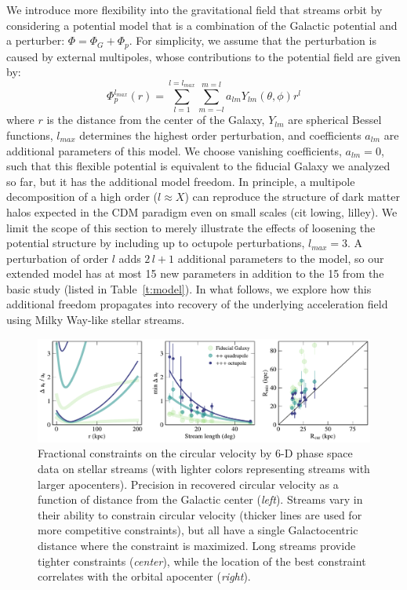 \documentclass[modern]{aastex61}
\begin{document}
We introduce more flexibility into the gravitational field that streams orbit by considering a potential model that is a combination of the Galactic potential and a perturber: $\Phi = \Phi_{G} + \Phi_{p}$. 
For simplicity, we assume that the perturbation is caused by external multipoles, whose contributions to the potential field are given by:
\begin{equation}
\Phi_{p}^{l_{max}}(r) = \sum_{l=1}^{l=l_{max}}\sum_{m=-l}^{m=l} a_{lm} Y_{lm}(\theta,\phi) r^l
\label{eq:multipoles}
\end{equation}
where $r$ is the distance from the center of the Galaxy, $Y_{lm}$ are spherical Bessel functions, $l_{max}$ determines the highest order perturbation, and coefficients $a_{lm}$ are additional parameters of this model.
We choose vanishing coefficients, $a_{lm}=0$, such that this flexible potential is equivalent to the fiducial Galaxy we analyzed so far, but it has the additional model freedom.
In principle, a multipole decomposition of a high order ($l\approx X$) can reproduce the structure of dark matter halos expected in the CDM paradigm even on small scales (cit lowing, lilley).
We limit the scope of this section to merely illustrate the effects of loosening the potential structure by including up to octupole perturbations, $l_{max}=3$.
A perturbation of order $l$ adds $2\,l+1$ additional parameters to the model, so our extended model has at most 15 new parameters in addition to the 15 from the basic study (listed in Table~\ref{t:model}).
In what follows, we explore how this additional freedom propagates into recovery of the underlying acceleration field using Milky Way-like stellar streams.

\begin{figure}
\begin{center}
\includegraphics[width=\textwidth]{ar_crb_all.pdf}
\caption{Fractional constraints on the circular velocity by 6-D phase space data on stellar streams (with lighter colors representing streams with larger apocenters).
Precision in recovered circular velocity as a function of distance from the Galactic center (\emph{left}).
Streams vary in their ability to constrain circular velocity (thicker lines are used for more competitive constraints), but all have a single Galactocentric distance where the constraint is maximized.
Long streams provide tighter constraints (\emph{center}), while the location of the best constraint correlates with the orbital apocenter (\emph{right}).
}
\label{fig:ar_all}
\end{center}
\end{figure}
\end{document}
